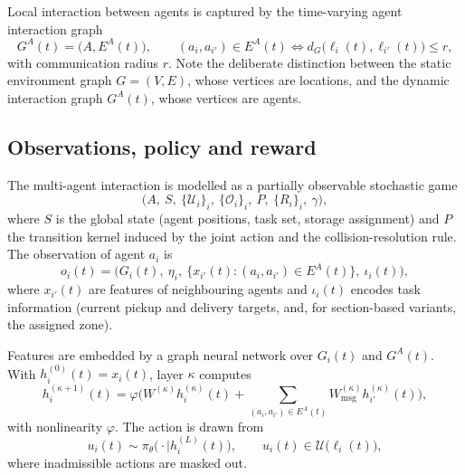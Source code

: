 Local interaction between agents is captured by the time-varying agent
interaction graph
\begin{equation}
  G^{A}(t) = \big(A, E^{A}(t)\big),
  \qquad
  (a_i, a_{i'}) \in E^{A}(t) \iff d_G\big(\ell_i(t), \ell_{i'}(t)\big) \leq r ,
  \label{eq:agent-graph}
\end{equation}
with communication radius \( r \). Note the deliberate distinction between
the static environment graph \( G = (V,E) \), whose vertices are locations,
and the dynamic interaction graph \( G^{A}(t) \), whose vertices are agents.

\subsection{Observations, policy and reward}

The multi-agent interaction is modelled as a partially observable stochastic
game
\begin{equation}
  \big( A,\ S,\ \{\mathcal{U}_i\}_{i},\ \{\mathcal{O}_i\}_{i},\ P,\ \{R_i\}_{i},\ \gamma \big),
\end{equation}
where \( S \) is the global state (agent positions, task set, storage
assignment) and \( P \) the transition kernel induced by the joint action and
the collision-resolution rule. The observation of agent \( a_i \) is
\begin{equation}
  o_i(t) = \Big(
    G_i(t),\ \eta_i,\
    \{ x_{i'}(t) : (a_i, a_{i'}) \in E^{A}(t) \},\
    \iota_i(t)
  \Big),
  \label{eq:observation}
\end{equation}
where \( x_{i'}(t) \) are features of neighbouring agents and \( \iota_i(t) \)
encodes task information (current pickup and delivery targets, and, for
section-based variants, the assigned zone).

Features are embedded by a graph neural network over \( G_i(t) \) and
\( G^{A}(t) \). With \( h_i^{(0)}(t) = x_i(t) \), layer \( \kappa \) computes
\begin{equation}
  h_i^{(\kappa+1)}(t)
  = \varphi\Big(
      W^{(\kappa)} h_i^{(\kappa)}(t)
      + \!\!\sum_{(a_i,a_{i'}) \in E^{A}(t)}\!\! W_{\mathrm{msg}}^{(\kappa)} h_{i'}^{(\kappa)}(t)
    \Big),
  \label{eq:gnn}
\end{equation}
with nonlinearity \( \varphi \). The action is drawn from
\begin{equation}
  u_i(t) \sim \pi_\theta\big( \cdot \mid h_i^{(L)}(t) \big),
  \qquad u_i(t) \in \mathcal{U}\big(\ell_i(t)\big),
\end{equation}
where inadmissible actions are masked out.


